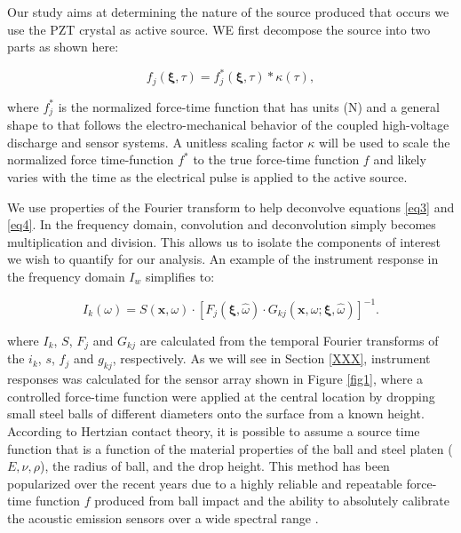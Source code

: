 \documentclass[preprint,3p, 11pt,authoryear]{elsarticle}
\begin{document}
Our study aims at determining the nature of the source produced that occurs we use the PZT crystal as active source. WE first decompose the source into two parts as shown here:

\begin{equation}
    \label{eq4}
    f_{j}\left( \mathbf{\xi}, \tau \right) = f^{*}_{j}\left( \mathbf{\xi}, \tau \right)  \ast \kappa \left( \tau \right),
\end{equation}

\noindent where $f^{*}_{j}$ is the normalized force-time function that has units (N) and a general shape to that follows the electro-mechanical behavior of the coupled high-voltage discharge and sensor systems.  A unitless scaling factor $\kappa$ will be used to scale the normalized force time-function $f^{*}$ to the true force-time function $f$ and likely varies with the time as the electrical pulse is applied to the active source.

We use properties of the Fourier transform \citep{Bracewell1986} to help deconvolve equations \eqref{eq3} and \eqref{eq4}.  In the frequency domain, convolution and deconvolution simply becomes multiplication and division. This allows us to isolate the components of interest we wish to quantify for our analysis. An example of the instrument response in the frequency domain $I_{w}$ simplifies to:

\begin{equation}
    \label{eq5}
        I_{k}\left(\omega \right) = 
        S\left( \mathbf{x}, \omega \right) \cdot \left[ F_{j}\left( \mathbf{\xi}, \hat{\omega} \right) \cdot G_{kj}\left( \mathbf{x}, \omega; \mathbf{\xi}, \hat{\omega} \right)\right]^{-1} .
\end{equation}

\noindent where $I_{k}$, $S$, $F_{j}$ and $G_{kj}$ are calculated from the temporal Fourier transforms of the $i_{k}$, $s$, $f_{j}$ and $g_{kj}$, respectively.  As we will see in Section \ref{XXX}, instrument responses was calculated for the sensor array shown in Figure \ref{fig1}, where a controlled force-time function were applied at the central location by dropping small steel balls of different diameters onto the surface from a known height. According to Hertzian contact theory, it is possible to assume a source time function that is a function of the material properties of the ball and steel platen ($E, \nu, \rho$), the radius of ball, and the drop height. This method has been popularized over the recent years due to a highly reliable and repeatable force-time function $f$ produced from ball impact and the ability to absolutely calibrate the acoustic emission sensors over a wide spectral range \citep{McLaskey2010, McLaskey2012, McLaskey2015}.
\end{document}

